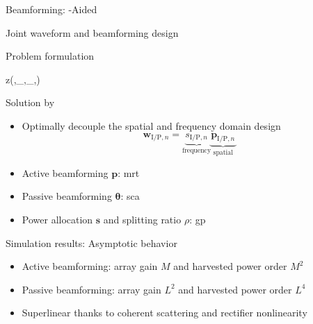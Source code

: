 \documentclass[presentation,xcolor={table},9pt]{beamer}
\begin{document}
\begin{section}{Beamforming: -Aided }
	\begin{frame}{Joint waveform and beamforming design}
		\begin{block}{Problem formulation}
			\vspace{-0.25cm}
			\begin{maxi*}
				{}{z(\boldsymbol{\theta},\mathbf{W}_,_,\rho)}{}{}
			\end{maxi*}
		\end{block}
		\begin{exampleblock}{Solution by }
			\begin{itemize}
				\item Optimally decouple the spatial and frequency domain design
				\begin{equation*}
					\mathbf{w}_{\mathrm{I/P}, n} = \underbrace{s_{\mathrm{I/P}, n}}_\text{frequency} \underbrace{\mathbf{p}_{\mathrm{I/P}, n}}_\text{spatial}
				\end{equation*}
				\item Active beamforming $\mathbf{p}$: \gls{mrt}
				\item Passive beamforming $\boldsymbol{\theta}$: \gls{sca}
				\item Power allocation $\mathbf{s}$ and splitting ratio $\rho$: \gls{gp}
			\end{itemize}
		\end{exampleblock}
	\end{frame}

	\begin{frame}{Simulation results: Asymptotic behavior}
		\begin{figure}
			\centering
		\end{figure}
		\begin{itemize}
			\item Active beamforming: array gain $M$ and harvested power order $M^2$
			\item Passive beamforming: array gain $L^2$ and harvested power order $L^4$
			\item Superlinear thanks to coherent scattering and rectifier nonlinearity
		\end{itemize}
	\end{frame}
\end{section}
\end{document}

